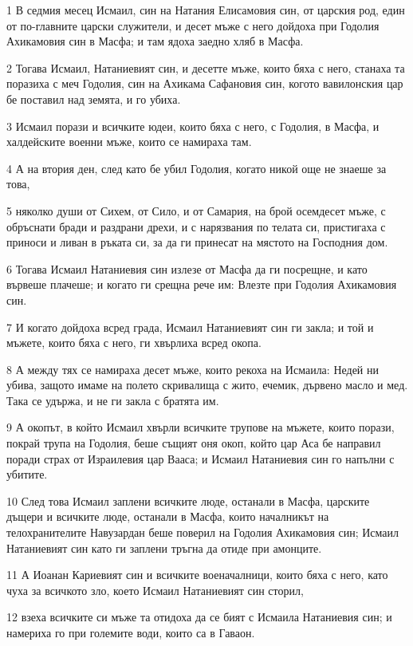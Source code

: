\par 1 В седмия месец Исмаил, син на Натания Елисамовия син, от царския род, един от по-главните царски служители, и десет мъже с него дойдоха при Годолия Ахикамовия син в Масфа; и там ядоха заедно хляб в Масфа.
\par 2 Тогава Исмаил, Натаниевият син, и десетте мъже, които бяха с него, станаха та поразиха с меч Годолия, син на Ахикама Сафановия син, когото вавилонския цар бе поставил над земята, и го убиха.
\par 3 Исмаил порази и всичките юдеи, които бяха с него, с Годолия, в Масфа, и халдейските военни мъже, които се намираха там.
\par 4 А на втория ден, след като бе убил Годолия, когато никой още не знаеше за това,
\par 5 няколко души от Сихем, от Сило, и от Самария, на брой осемдесет мъже, с обръснати бради и раздрани дрехи, и с нарязвания по телата си, пристигаха с приноси и ливан в ръката си, за да ги принесат на мястото на Господния дом.
\par 6 Тогава Исмаил Натаниевия син излезе от Масфа да ги посрещне, и като вървеше плачеше; и когато ги срещна рече им: Влезте при Годолия Ахикамовия син.
\par 7 И когато дойдоха всред града, Исмаил Натаниевият син ги закла; и той и мъжете, които бяха с него, ги хвърлиха всред окопа.
\par 8 А между тях се намираха десет мъже, които рекоха на Исмаила: Недей ни убива, защото имаме на полето скривалища с жито, ечемик, дървено масло и мед. Така се удържа, и не ги закла с братята им.
\par 9 А окопът, в който Исмаил хвърли всичките трупове на мъжете, които порази, покрай трупа на Годолия, беше същият оня окоп, който цар Аса бе направил поради страх от Израилевия цар Вааса; и Исмаил Натаниевия син го напълни с убитите.
\par 10 След това Исмаил заплени всичките люде, останали в Масфа, царските дъщери и всичките люде, останали в Масфа, които началникът на телохранителите Навузардан беше поверил на Годолия Ахикамовия син; Исмаил Натаниевият син като ги заплени тръгна да отиде при амонците.
\par 11 А Иоанан Кариевият син и всичките военачалници, които бяха с него, като чуха за всичкото зло, което Исмаил Натаниевият син сторил,
\par 12 взеха всичките си мъже та отидоха да се бият с Исмаила Натаниевия син; и намериха го при големите води, които са в Гаваон.
